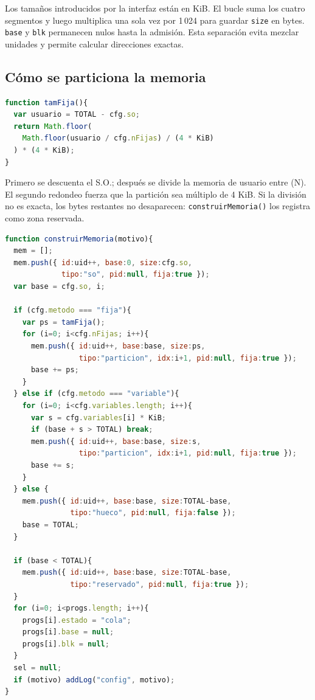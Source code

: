 \documentclass[11pt,a4paper]{article}
\newcommand{\funcion}[1]{\texttt{#1()}}
\begin{document}
Los tamaños introducidos por la interfaz están en KiB. El bucle suma los cuatro
segmentos y luego multiplica una sola vez por 1\,024 para guardar \texttt{size} en
bytes. \texttt{base} y \texttt{blk} permanecen nulos hasta la admisión. Esta
separación evita mezclar unidades y permite calcular direcciones exactas.

\subsection{Cómo se particiona la memoria}

\begin{lstlisting}[language=JavaScript,caption={Tamaño de una partición fija igual.}]
function tamFija(){
  var usuario = TOTAL - cfg.so;
  return Math.floor(
    Math.floor(usuario / cfg.nFijas) / (4 * KiB)
  ) * (4 * KiB);
}
\end{lstlisting}

Primero se descuenta el S.O.; después se divide la memoria de usuario entre (N).
El segundo redondeo fuerza que la partición sea múltiplo de 4 KiB. Si la división
no es exacta, los bytes restantes no desaparecen: \funcion{construirMemoria} los
registra como zona reservada.

\begin{lstlisting}[language=JavaScript,caption={Construcción de los tres esquemas de memoria.}]
function construirMemoria(motivo){
  mem = [];
  mem.push({ id:uid++, base:0, size:cfg.so,
             tipo:"so", pid:null, fija:true });
  var base = cfg.so, i;

  if (cfg.metodo === "fija"){
    var ps = tamFija();
    for (i=0; i<cfg.nFijas; i++){
      mem.push({ id:uid++, base:base, size:ps,
                 tipo:"particion", idx:i+1, pid:null, fija:true });
      base += ps;
    }
  } else if (cfg.metodo === "variable"){
    for (i=0; i<cfg.variables.length; i++){
      var s = cfg.variables[i] * KiB;
      if (base + s > TOTAL) break;
      mem.push({ id:uid++, base:base, size:s,
                 tipo:"particion", idx:i+1, pid:null, fija:true });
      base += s;
    }
  } else {
    mem.push({ id:uid++, base:base, size:TOTAL-base,
               tipo:"hueco", pid:null, fija:false });
    base = TOTAL;
  }

  if (base < TOTAL){
    mem.push({ id:uid++, base:base, size:TOTAL-base,
               tipo:"reservado", pid:null, fija:true });
  }
  for (i=0; i<progs.length; i++){
    progs[i].estado = "cola";
    progs[i].base = null;
    progs[i].blk = null;
  }
  sel = null;
  if (motivo) addLog("config", motivo);
}
\end{lstlisting}
\end{document}
